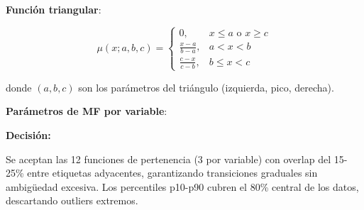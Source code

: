 \documentclass[12pt,letterpaper,twoside]{report}
\begin{document}
\begin{calculobox}
\textbf{Función triangular}:

\begin{equation}
\mu(x; a, b, c) = 
\begin{cases}
0, & x \leq a \text{ o } x \geq c \\
\frac{x-a}{b-a}, & a < x < b \\
\frac{c-x}{c-b}, & b \leq x < c
\end{cases}
\end{equation}

donde $(a, b, c)$ son los parámetros del triángulo (izquierda, pico, derecha).

\textbf{Parámetros de MF por variable}:

\begin{table}[H]
\centering
\caption{Parámetros de Funciones de Pertenencia (Percentiles)}
\label{tab:mf_params}
\end{table}
\end{calculobox}

\begin{decisionbox}
\textbf{Decisión:}

Se aceptan las 12 funciones de pertenencia (3 por variable) con overlap del 15-25\% entre etiquetas adyacentes, garantizando transiciones graduales sin ambigüedad excesiva. Los percentiles p10-p90 cubren el 80\% central de los datos, descartando outliers extremos.
\end{decisionbox}
\end{document}
